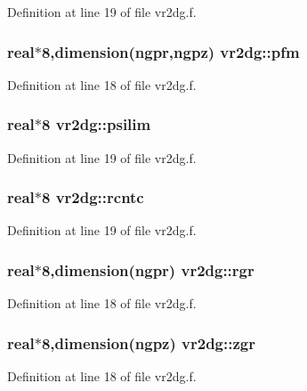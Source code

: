 Definition at line 19 of file vr2dg.f.\hypertarget{namespacevr2dg_42625803c3e8d435cb3bcfbcdee23e3c}{
\subsubsection[pfm]{\setlength{\rightskip}{0pt plus 5cm}real$\ast$8,dimension(ngpr,ngpz) {\bf vr2dg::pfm}}}
\label{namespacevr2dg_42625803c3e8d435cb3bcfbcdee23e3c}




Definition at line 18 of file vr2dg.f.\hypertarget{namespacevr2dg_392d636527ed6281bd226ab7b1c54ac1}{
\subsubsection[psilim]{\setlength{\rightskip}{0pt plus 5cm}real$\ast$8 {\bf vr2dg::psilim}}}
\label{namespacevr2dg_392d636527ed6281bd226ab7b1c54ac1}




Definition at line 19 of file vr2dg.f.\hypertarget{namespacevr2dg_93160973c5eabc15efb36b70f53bcb02}{
\subsubsection[rcntc]{\setlength{\rightskip}{0pt plus 5cm}real$\ast$8 {\bf vr2dg::rcntc}}}
\label{namespacevr2dg_93160973c5eabc15efb36b70f53bcb02}




Definition at line 19 of file vr2dg.f.\hypertarget{namespacevr2dg_3eeb651bf34a7d309b1864cc47e11dcb}{
\subsubsection[rgr]{\setlength{\rightskip}{0pt plus 5cm}real$\ast$8,dimension(ngpr) {\bf vr2dg::rgr}}}
\label{namespacevr2dg_3eeb651bf34a7d309b1864cc47e11dcb}




Definition at line 18 of file vr2dg.f.\hypertarget{namespacevr2dg_5d150eacbf91120938d72cbc757d5553}{
\subsubsection[zgr]{\setlength{\rightskip}{0pt plus 5cm}real$\ast$8,dimension(ngpz) {\bf vr2dg::zgr}}}
\label{namespacevr2dg_5d150eacbf91120938d72cbc757d5553}




Definition at line 18 of file vr2dg.f.